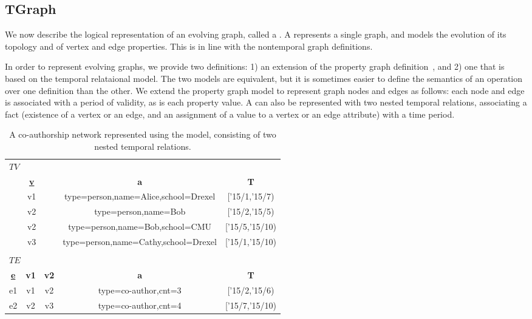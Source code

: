 \subsection{TGraph}

We now describe the logical representation of an evolving graph,
called a \tg.  A \tg represents a single graph, and models the
evolution of its topology and of vertex and edge properties.  This is
in line with the nontemporal graph definitions.  

In order to represent evolving graphs, we provide two definitions: 1)
an extension of the property graph
definition~\cite{DBLP:journals/corr/AnglesABHRV16}, and 2) one that is
based on the temporal relataional model.  The two models are equivalent,
but it is sometimes easier to define the semantics of an operation
over one definition than the other.  We extend the property graph
model to represent graph nodes and edges as follows: each node and
edge is associated with a period of validity, as is each property
value.  A \tg can also be represented with two nested
temporal relations, associating a fact (existence of a vertex or an edge,
and an assignment of a value to a vertex or an edge attribute) with a
time period.

\begin{table*}
\caption{A co-authorship network represented using the \tg model,
  consisting of two nested temporal relations.}
\vspace{-0.2cm}
\label{tab:tg}
\centering
\begin{tabular}{| c | c | c | c | c |}
\hline
\multicolumn{5}{|l|}{$TV$} \\
\multicolumn{3}{|c}{\bfseries{\underline v}} & \multicolumn{1}{c}{\bfseries a} & \multicolumn{1}{c|}{\bfseries T}\\ \hline
\multicolumn{3}{|c|}{v1} & type=person,name=Alice,school=Drexel & ['15/1,'15/7) \\ \hline
\multicolumn{3}{|c|}{v2} & type=person,name=Bob & ['15/2,'15/5) \\ \hline
\multicolumn{3}{|c|}{v2} & type=person,name=Bob,school=CMU & ['15/5,'15/10) \\ \hline
\multicolumn{3}{|c|}{v3} & type=person,name=Cathy,school=Drexel & ['15/1,'15/10) \\ \hline
\multicolumn{5}{|l|}{} \\
\multicolumn{5}{|l|}{$TE$} \\
\multicolumn{1}{|c}{\bfseries{\underline e}} & \multicolumn{1}{c}{\bfseries v1} & \multicolumn{1}{c}{\bfseries v2} & \multicolumn{1}{c}{\bfseries a} & \multicolumn{1}{c|}{\bfseries T} \\ \hline
e1 & v1 & v2 & type=co-author,cnt=3 & ['15/2,'15/6) \\ \hline
e2 & v2 & v3 & type=co-author,cnt=4 & ['15/7,'15/10) \\ \hline
\end{tabular}
\vspace{-0.2cm}
\end{table*}

